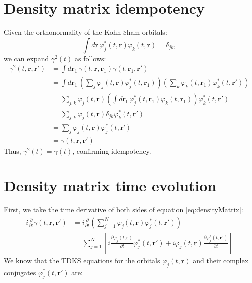 \section{Density matrix idempotency}
\label{sec:density_matrix_idempotency}

Given the orthonormality of the Kohn-Sham orbitals:
\[
\int d\mathbf{r}\, \varphi_{j}^{*}(t, \mathbf{r}) \varphi_{k}(t, \mathbf{r}) = \delta_{jk},
\]
we can expand $\gamma^2(t)$ as follows:
\begin{align*}
\gamma^{2}(t, \mathbf{r}, \mathbf{r}') &= \int d\mathbf{r}_1\, \gamma(t, \mathbf{r}, \mathbf{r}_1) \gamma(t, \mathbf{r}_1, \mathbf{r}') \\
&= \int d\mathbf{r}_1\, \left( \sum_{j} \varphi_{j}(t, \mathbf{r}) \varphi_{j}^{*}(t, \mathbf{r}_1) \right) \left( \sum_{k} \varphi_{k}(t, \mathbf{r}_1) \varphi_{k}^{*}(t, \mathbf{r}') \right) \\
&= \sum_{j,k} \varphi_{j}(t, \mathbf{r}) \left( \int d\mathbf{r}_1\, \varphi_{j}^{*}(t, \mathbf{r}_1) \varphi_{k}(t, \mathbf{r}_1) \right) \varphi_{k}^{*}(t, \mathbf{r}') \\
&= \sum_{j,k} \varphi_{j}(t, \mathbf{r}) \delta_{jk} \varphi_{k}^{*}(t, \mathbf{r}') \\
&= \sum_{j} \varphi_{j}(t, \mathbf{r}) \varphi_{j}^{*}(t, \mathbf{r}') \\
&= \gamma(t, \mathbf{r}, \mathbf{r}')
\end{align*}
Thus, $\gamma^{2}(t) = \gamma(t)$, confirming idempotency.
\section{Density matrix time evolution}
\label{sec:densityMatrixTD}
First, we take the time derivative of both sides of equation \ref{eq:densityMatrix}:
\begin{align}
i \frac{\partial}{\partial t} \gamma(t, \mathbf{r}, \mathbf{r}') &= i \frac{\partial}{\partial t} \left( \sum_{j=1}^{N} \varphi_{j}(t, \mathbf{r}) \varphi_{j}^{*}(t, \mathbf{r}') \right) \\
&= \sum_{j=1}^{N} \left[ i \frac{\partial \varphi_{j}(t, \mathbf{r})}{\partial t} \varphi_{j}^{*}(t, \mathbf{r}') + i \varphi_{j}(t, \mathbf{r}) \frac{\partial \varphi_{j}^{*}(t, \mathbf{r}')}{\partial t} \right]
\end{align}
We know that the TDKS equations for the orbitals \( \varphi_{j}(t, \mathbf{r}) \) and their complex conjugates \( \varphi_{j}^{*}(t, \mathbf{r}') \) are:

